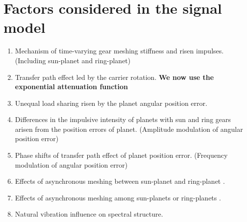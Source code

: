 \documentclass[a4paper,fleqn]{cas-sc}%
\begin{document}
\section{Factors considered in the signal model}
\begin{enumerate}
    \item Mechanism of time-varying gear meshing stiffness and risen impulses. (Including sun-planet and ring-planet)
    \item Transfer path effect led by the carrier rotation. \textbf{We now use the exponential attenuation function}
    \item Unequal load sharing risen by the planet angular position error.
    \item Differences in the impulsive intensity of planets with sun and ring gears arisen from the position errors of planet. (Amplitude modulation of angular position error)
    \item Phase shifts of transfer path effect of planet position error. (Frequency modulation of angular position error)
    \item Effects of asynchronous meshing between sun-planet and ring-planet \cite{Parker2004}.
    \item Effects of asynchronous meshing among sun-planets or ring-planets \cite{Inalpolat2009}.
    \item Natural vibration influence on spectral structure.
\end{enumerate}
\end{document}
